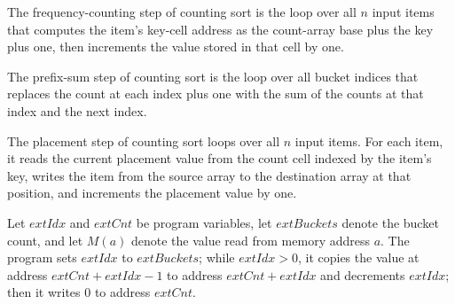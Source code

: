 \begin{definition}
\label{Light.csCount}
\leanok
{}
The frequency-counting step of counting sort is the loop over all $n$ input items that
computes the item's key-cell address as the count-array base plus the key plus one, then
increments the value stored in that cell by one.
\end{definition}

\begin{definition}
\label{Light.csPrefix}
\leanok
{}
The prefix-sum step of counting sort is the loop over all bucket indices that replaces
the count at each index plus one with the sum of the counts at that index and the next
index.
\end{definition}

\begin{definition}
\label{Light.csPlace}
\leanok
{}
The placement step of counting sort loops over all $n$ input items. For each item, it
reads the current placement value from the count cell indexed by the item's key, writes
the item from the source array to the destination array at that position, and increments
the placement value by one.
\end{definition}

\begin{definition}
\label{Light.csShift}
\leanok
{}
Let $	ext{Idx}$ and $	ext{Cnt}$ be program variables, let $	ext{Buckets}$ denote the
bucket count, and let $M(a)$ denote the value read from memory address $a$. The program
sets $	ext{Idx}$ to $	ext{Buckets}$; while $	ext{Idx}>0$, it copies the value at address
$	ext{Cnt}+	ext{Idx}-1$ to address $	ext{Cnt}+	ext{Idx}$ and decrements $	ext{Idx}$;
then it writes $0$ to address $	ext{Cnt}$.
\end{definition}

